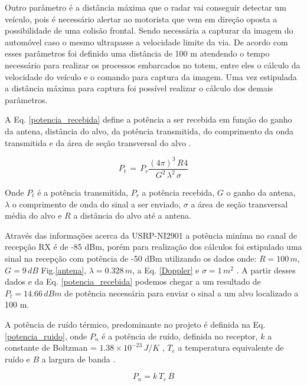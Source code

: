 Outro parâmetro é a distância máxima que o radar vai conseguir detectar um veículo, pois é necessário alertar ao motorista que vem em direção oposta a possibilidade de uma colisão frontal. Sendo necessária a capturar da imagem do automóvel caso o mesmo ultrapasse a velocidade limite da via. De acordo com esses parâmetros foi definido uma distância de 100 m atendendo o tempo necessário para realizar os processos embarcados no totem, entre eles o cálculo da velocidade do veículo e o comando para captura da imagem. Uma vez estipulada a distância máxima para captura foi possível realizar o cálculo dos demais parâmetros.

A Eq. \ref{potencia_recebida} define a potência a ser recebida em função do ganho da antena, distância do alvo, da potência transmitida, do comprimento da onda transmitida e da área de seção transversal do alvo \cite{richards2010principles}.

\begin{equation}\label{potencia_recebida}
    P_t\, =\,   P_r \frac{(4\pi)^{3}\,  R^{}4}{G^{2}\,   \lambda^{2}\, \sigma }
\end{equation}%

Onde $P_t$ é a potência transmitida, $P_r$ a potência recebida, $G$ o ganho da antena, $\lambda$ o comprimento de onda do sinal a ser enviado, $\sigma$ a área de seção transversal média do alvo e $R$ a distância do alvo até a antena.

Através das informações acerca da USRP-NI2901 \cite{rds} a potência miníma no canal de recepção RX é de -85 dBm, porém para realização dos cálculos foi estipulado uma sinal na recepção com potência de -50 dBm utilizando os dados onde: $R=100 \, m$, $G=9 \, dB$ Fig.\ref{antena}, $\lambda=0.328 \, m$, a Eq. \ref{Doppler} e $\sigma=1 \, m^{2}$ \cite{richards2010principles}. A partir desses dados e da Eq. \ref{potencia_recebida} podemos chegar a um resultado de $P_t=14.66 \, dBm$ de potência necessária para enviar o sinal a um alvo localizado a 100 m.

A potência de ruído térmico, predominante no projeto é definida na Eq. \ref{potencia_ruido}, onde $P_n$ é a potência de ruído, definida no receptor, $k$ a constante de Boltzman = $1.38 \times 10^{-23} \, J/K$ , $T_e$ a temperatura equivalente de ruído e $B$ a largura de banda \cite{richards2010principles}.

\begin{equation}\label{potencia_ruido}
    P_n = k\, T_e\,B
\end{equation}

